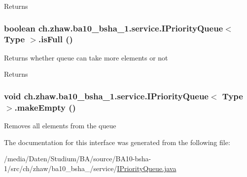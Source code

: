 \begin{DoxyReturn}{Returns}

\end{DoxyReturn}
\hypertarget{interfacech_1_1zhaw_1_1ba10__bsha__1_1_1service_1_1IPriorityQueue_3_01Type_01_4_aa4d7034ec67137e3df7ff738bcafafe0}{
\subsubsection[{isFull}]{\setlength{\rightskip}{0pt plus 5cm}boolean ch.zhaw.ba10\_\-bsha\_\-1.service.IPriorityQueue$<$ Type $>$.isFull ()}}
\label{interfacech_1_1zhaw_1_1ba10__bsha__1_1_1service_1_1IPriorityQueue_3_01Type_01_4_aa4d7034ec67137e3df7ff738bcafafe0}
Returns whether queue can take more elements or not

\begin{DoxyReturn}{Returns}

\end{DoxyReturn}
\hypertarget{interfacech_1_1zhaw_1_1ba10__bsha__1_1_1service_1_1IPriorityQueue_3_01Type_01_4_ae7df246cb037e0976dfbc24c720d273a}{
\subsubsection[{makeEmpty}]{\setlength{\rightskip}{0pt plus 5cm}void ch.zhaw.ba10\_\-bsha\_\-1.service.IPriorityQueue$<$ Type $>$.makeEmpty ()}}
\label{interfacech_1_1zhaw_1_1ba10__bsha__1_1_1service_1_1IPriorityQueue_3_01Type_01_4_ae7df246cb037e0976dfbc24c720d273a}
Removes all elements from the queue 

The documentation for this interface was generated from the following file:\begin{DoxyCompactItemize}
\item 
/media/Daten/Studium/BA/source/BA10-\/bsha-\/1/src/ch/zhaw/ba10\_\-bsha\_/service/\hyperlink{IPriorityQueue_8java}{IPriorityQueue.java}\end{DoxyCompactItemize}
